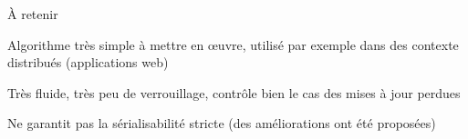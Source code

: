 \begin{frame}{À retenir}

Algorithme très simple à mettre en œuvre, utilisé par exemple dans des contexte distribués (applications web)

\vfill

Très fluide, très peu de verrouillage, contrôle bien le cas des mises à jour perdues

\vfill

\begin{blocgauche}
Ne garantit pas la sérialisabilité stricte (des améliorations ont été proposées)
\end{blocgauche}


\end{frame}


